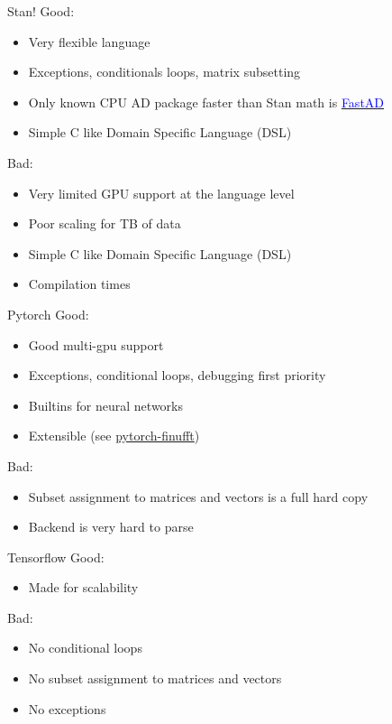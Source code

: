 \documentclass[dvipsnames]{beamer}
\begin{document}
\begin{frame}{Stan!}
Good:
\begin{itemize}
    \item Very flexible language
    \item Exceptions, conditionals loops, matrix subsetting
    \item Only known CPU AD package faster than Stan math is \href{https://godbolt.org/z/6PG475K1W}{\textcolor{blue}{FastAD}}
    \item Simple C like Domain Specific Language (DSL)
\end{itemize}
Bad:
\begin{itemize}
    \item Very limited GPU support at the language level
    \item Poor scaling for TB of data
    \item Simple C like Domain Specific Language (DSL)
    \item Compilation times
\end{itemize}
\end{frame}

\begin{frame}{Pytorch}
Good:
\begin{itemize}
    \item Good multi-gpu support
    \item Exceptions, conditional loops, debugging first priority
    \item Builtins for neural networks
    \item Extensible (see \href{https://github.com/flatironinstitute/pytorch-finufft}{pytorch-finufft})
\end{itemize}
Bad:
\begin{itemize}
    \item Subset assignment to matrices and vectors is a full hard copy
    \item Backend is very hard to parse
\end{itemize}
\end{frame}

\begin{frame}{Tensorflow}
Good:
\begin{itemize}
    \item Made for scalability
\end{itemize}
Bad:
\begin{itemize}
    \item No conditional loops
    \item No subset assignment to matrices and vectors
    \item No exceptions
\end{itemize}
\end{frame}
\end{document}
